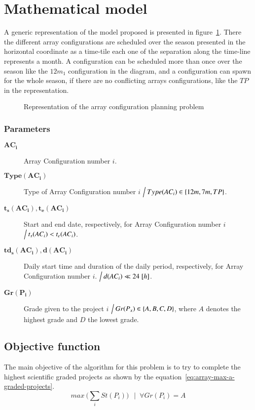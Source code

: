 \section{Mathematical model}

A generic representation of the model proposed is presented in figure~\ref{fig:array-planning-representation}. There the different array configurations are scheduled over the season presented in the horizontal coordinate as a time-tile each one of the separation along the time-line represents a month. A configuration can be scheduled more than once over the season like the $12m_1$ configuration in the diagram, and a configuration can spawn for the whole season, if there are no conflicting arrays configurations, like the $TP$ in the representation.

\begin{figure}
\def\svgwidth{\textwidth}

\caption{Representation of the array configuration planning problem}
\label{fig:array-planning-representation}
\end{figure}

\subsubsection{Parameters}
\begin{description}
\item[$\mathbf{AC_i}$] Array Configuration number $i$.

\item[$\mathbf{Type(AC_i)}$] Type of Array Configuration number $i$ $\Big\slash\: Type(AC_i) \in \{12m, 7m, TP\}$.

\item[$\mathbf{t_s(AC_i), t_e(AC_i)}$] Start and end date, respectively, for Array Configuration number $i$ $\Big\slash\: t_s(AC_i) < t_e(AC_i)$.

\item[$\mathbf{td_s(AC_i), d(AC_i)}$] Daily start time and duration of the daily period, respectively, for Array Configuration number $i$. $\Big\slash\: d(AC_i) \ll 24\;[h]$.

\item[$\mathbf{Gr(P_i)}$] Grade given to the project $i$ $\Big\slash\: Gr(P_x) \in \{A,B,C,D\}$, where $A$ denotes the highest grade and $D$ the lowest grade.
\end{description}

\subsection{Objective function}
The main objective of the algorithm for this problem is to try to complete the highest scientific graded projects as shown by the equation~\ref{eq:array-max-a-graded-projects}.
\begin{equation}
\label{eq:array-max-a-graded-projects}
max \: \bigg(\sum_{i} St(P_i)\bigg) \:\: \mid\; \forall Gr(P_i) = A
\end{equation}

